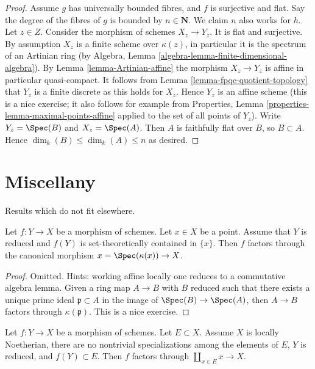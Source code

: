 \begin{proof}
Assume $g$ has universally bounded fibres, and $f$ is surjective and flat.
Say the degree of the fibres of $g$ is bounded by $n \in \mathbf{N}$.
We claim $n$ also works for $h$.
Let $z \in Z$. Consider the morphism of schemes $X_z \to Y_z$.
It is flat and surjective. By assumption $X_z$ is a finite scheme
over $\kappa(z)$, in particular it is the spectrum of an
Artinian ring (by
Algebra, Lemma \ref{algebra-lemma-finite-dimensional-algebra}).
By Lemma \ref{lemma-Artinian-affine} the morphism $X_z \to Y_z$ is affine
in particular quasi-compact. It follows from
Lemma \ref{lemma-fpqc-quotient-topology}
that $Y_z$ is a finite discrete as this holds for $X_z$.
Hence $Y_z$ is an affine scheme (this is a nice exercise; it also follows
for example from
Properties, Lemma \ref{properties-lemma-maximal-points-affine}
applied to the set of all points of $Y_z$).
Write $Y_z = \Spec(B)$ and $X_z = \Spec(A)$.
Then $A$ is faithfully flat over $B$, so $B \subset A$.
Hence $\dim_k(B) \leq \dim_k(A) \leq n$ as desired.
\end{proof}





\section{Miscellany}
\label{section-misc}

\noindent
Results which do not fit elsewhere.

\begin{lemma}
\label{lemma-factor-through-point}
Let $f : Y \to X$ be a morphism of schemes. Let $x \in X$ be a point.
Assume that $Y$ is reduced and $f(Y)$ is set-theoretically contained
in $\{x\}$. Then $f$ factors through the canonical morphism
$x = \Spec(\kappa(x)) \to X$.
\end{lemma}

\begin{proof}
Omitted. Hints: working affine locally one reduces to a commutative algebra
lemma. Given a ring map $A \to B$ with $B$ reduced such that there exists
a unique prime ideal $\mathfrak p \subset A$ in the image of
$\Spec(B) \to \Spec(A)$, then $A \to B$ factors through $\kappa(\mathfrak p)$.
This is a nice exercise.
\end{proof}

\begin{lemma}
\label{lemma-factor-through-set-of-points}
Let $f : Y \to X$ be a morphism of schemes. Let $E \subset X$.
Assume $X$ is locally Noetherian, there are no nontrivial specializations
among the elements of $E$, $Y$ is reduced, and $f(Y) \subset E$.
Then $f$ factors through $\coprod_{x \in E} x \to X$.
\end{lemma}

